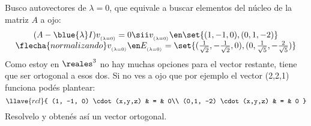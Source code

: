 \begin{enumerate}[label=(\alph*)]
        Busco autovectores de $\lambda = 0$, que equivale a buscar elementos del núcleo de la matriz $A$ a ojo:
        $$
          \begin{array}{c}
            (A - \blue{\lambda}I)v_{_{(\lambda = 0)}} = 0
            \sii
            v_{_{(\lambda = 0)}} \en \set{(1, -1, 0), (0,1, -2)} \\
            \flecha{normalizando}
            v_{_{(\lambda = 0)}} \en E_{_{(\lambda = 0)}} =
            \set{(\frac{1}{\sqrt{2}}, -\frac{1}{\sqrt{2}}, 0), (0,\frac{1}{\sqrt{5}}, -\frac{2}{\sqrt{5}})}
          \end{array}
        $$
        Como estoy en $\reales^3$ no hay muchas opciones para el vector restante, tiene que ser ortogonal a esos dos. Si no ves a ojo
        que por ejemplo el vector (2,2,1) funciona podés plantear:
        $$
          \llave{rcl}{
            (1, -1, 0) \cdot (x,y,z)    & = & 0\\
            (0,1, -2) \cdot (x,y,z)    & = & 0
          }
        $$
        Resolvelo y obtenés así un vector ortogonal.


\end{enumerate}
